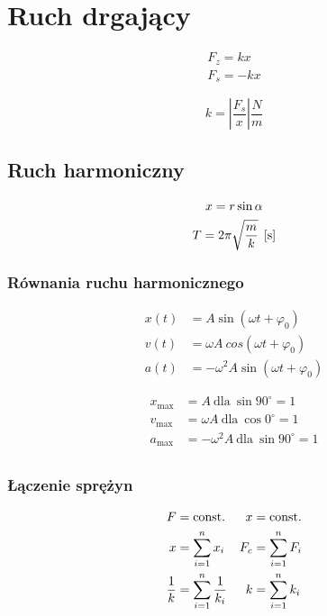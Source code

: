 \chapter{Ruch drgający}
\begin{gather}
  F_z = kx\\
  F_s = -kx
\end{gather}

\begin{equation*}
  k = \left|\frac{F_s}{x}\right| \unit{\frac N m}
\end{equation*}

\section{Ruch harmoniczny}
\begin{gather*}
  x = r \sin \alpha\\
  T = 2\pi \sqrt{\frac m k} \;\left[\mathrm{s}\right]
\end{gather*}

\subsection{Równania ruchu harmonicznego}
\begin{subequations}
  \begin{align}
    x(t) &= A \sin(\omega t + \varphi_0)\\
    v(t) &= \omega A\ cos(\omega t + \varphi_0)\\
    a(t) &= -\omega^2 A \sin(\omega t + \varphi_0)
  \end{align}
\end{subequations}

\begin{align*}
  x_\text{max} &= A\ \text{dla}\ \sin90^\circ = 1\\
  v_\text{max} &= \omega A\ \text{dla}\ \cos0^\circ = 1\\
  a_\text{max} &= -\omega^2 A\ \text{dla}\ \sin90^\circ = 1\\
\end{align*}

\subsection{Łączenie sprężyn}
\begin{align*}
  F &= \operatorname{const.} & x &= \operatorname{const.}\\
  x &= \sum_{i=1}^n x_i & F_c &= \sum_{i=1}^n F_i\\
  \frac 1 k &= \sum_{i=1}^n \frac{1}{k_i} & k &= \sum_{i=1}^n k_i
\end{align*}

